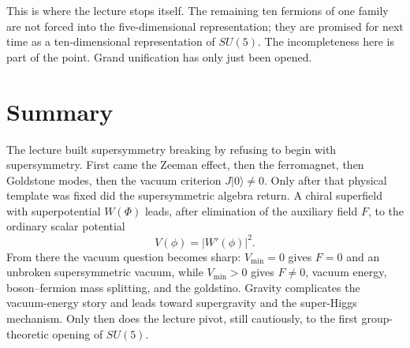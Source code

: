 This is where the lecture stops itself. The remaining ten fermions of one family are not forced into the five-dimensional representation; they are promised for next time as a ten-dimensional representation of \(SU(5)\). The incompleteness here is part of the point. Grand unification has only just been opened.

\section{Summary}

The lecture built supersymmetry breaking by refusing to begin with supersymmetry. First came the Zeeman effect, then the ferromagnet, then Goldstone modes, then the vacuum criterion \(J|0\rangle\neq 0\). Only after that physical template was fixed did the supersymmetric algebra return. A chiral superfield with superpotential \(W(\Phi)\) leads, after elimination of the auxiliary field \(F\), to the ordinary scalar potential
\begin{equation}
V(\phi)=|W'(\phi)|^2.
\end{equation}
From there the vacuum question becomes sharp: \(V_{\min}=0\) gives \(F=0\) and an unbroken supersymmetric vacuum, while \(V_{\min}>0\) gives \(F\neq 0\), vacuum energy, boson--fermion mass splitting, and the goldstino. Gravity complicates the vacuum-energy story and leads toward supergravity and the super-Higgs mechanism. Only then does the lecture pivot, still cautiously, to the first group-theoretic opening of \(SU(5)\).